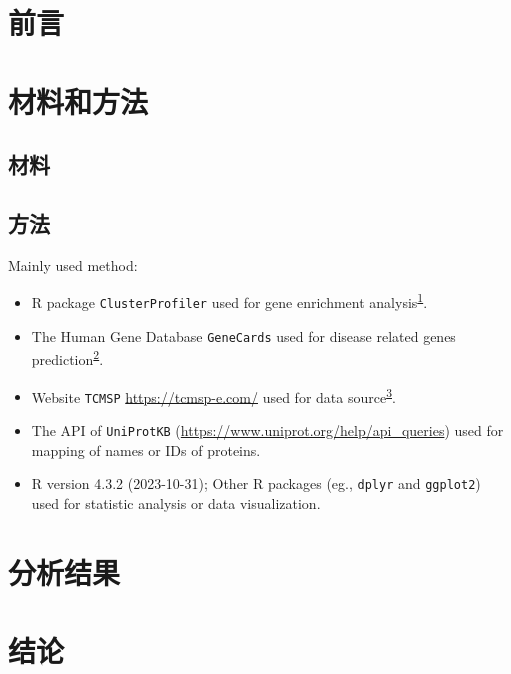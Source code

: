 \documentclass[
]{article}
\providecommand{\tightlist}{%
  \setlength{\itemsep}{0pt}\setlength{\parskip}{0pt}}
\begin{document}
\hypertarget{introduction}{%
\section{前言}\label{introduction}}

\hypertarget{methods}{%
\section{材料和方法}\label{methods}}

\hypertarget{ux6750ux6599}{%
\subsection{材料}\label{ux6750ux6599}}

\hypertarget{ux65b9ux6cd5}{%
\subsection{方法}\label{ux65b9ux6cd5}}

Mainly used method:

\begin{itemize}
\tightlist
\item
  R package \texttt{ClusterProfiler} used for gene enrichment analysis\textsuperscript{\protect\hyperlink{ref-ClusterprofilerWuTi2021}{1}}.
\item
  The Human Gene Database \texttt{GeneCards} used for disease related genes prediction\textsuperscript{\protect\hyperlink{ref-TheGenecardsSStelze2016}{2}}.
\item
  Website \texttt{TCMSP} \url{https://tcmsp-e.com/} used for data source\textsuperscript{\protect\hyperlink{ref-TcmspADatabaRuJi2014}{3}}.
\item
  The API of \texttt{UniProtKB} (\url{https://www.uniprot.org/help/api_queries}) used for mapping of names or IDs of proteins.
\item
  R version 4.3.2 (2023-10-31); Other R packages (eg., \texttt{dplyr} and \texttt{ggplot2}) used for statistic analysis or data visualization.
\end{itemize}

\hypertarget{results}{%
\section{分析结果}\label{results}}

\hypertarget{dis}{%
\section{结论}\label{dis}}
\end{document}
